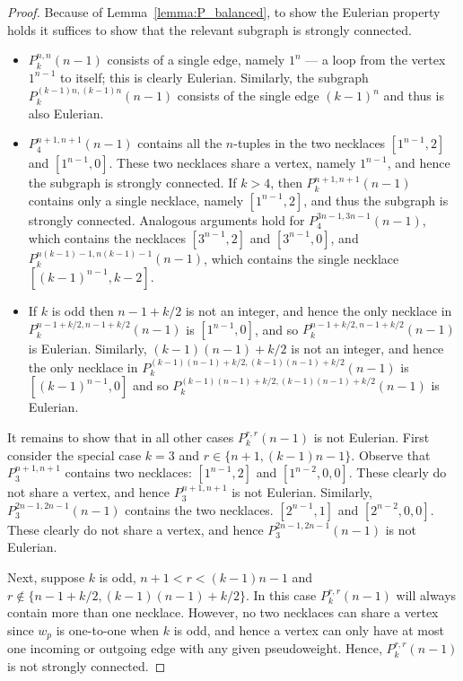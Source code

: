 \documentclass[a4paper,11pt]{article}
\theoremstyle{plain}
\theoremstyle{definition}
\theoremstyle{remark}
\begin{document}
\begin{proof}
Because of Lemma~\ref{lemma:P_balanced}, to show the Eulerian property holds it suffices to show
that the relevant subgraph is strongly connected.
\begin{itemize}
\item[(i)] $P_k^{n,n}(n-1)$ consists of a single edge, namely $1^n$ --- a loop from the vertex
    $1^{n-1}$ to itself; this is clearly Eulerian.  Similarly, the subgraph
    $P_k^{(k-1)n,(k-1)n}(n-1)$ consists of the single edge $(k-1)^n$ and thus is also Eulerian.
\item[(ii)] $P_4^{n+1,n+1}(n-1)$ contains all the $n$-tuples in the two necklaces $[1^{n-1},2]$
    and $[1^{n-1},0]$.  These two necklaces share a vertex, namely $1^{n-1}$, and hence the
    subgraph is strongly connected. If $k>4$, then $P_k^{n+1,n+1}(n-1)$ contains only a single
    necklace, namely $[1^{n-1},2]$, and thus the subgraph is strongly connected.  Analogous
    arguments hold for $P_4^{3n-1,3n-1}(n-1)$, which contains the necklaces $[3^{n-1},2]$ and
    $[3^{n-1},0]$, and $P_k^{n(k-1)-1,n(k-1)-1}(n-1)$, which contains the single necklace
    $[(k-1)^{n-1},k-2]$.
\item[(iii)] If $k$ is odd then $n-1+k/2$ is not an integer, and hence the only necklace in
    $P_k^{n-1+k/2,n-1+k/2}(n-1)$ is $[1^{n-1},0]$, and so $P_k^{n-1+k/2,n-1+k/2}(n-1)$ is
    Eulerian.  Similarly, $(k-1)(n-1)+k/2$ is not an integer, and hence the only necklace in
    $P_k^{(k-1)(n-1)+k/2,(k-1)(n-1)+k/2}(n-1)$ is $[(k-1)^{n-1},0]$ and so
    $P_k^{(k-1)(n-1)+k/2,(k-1)(n-1)+k/2}(n-1)$ is Eulerian.
\end{itemize}
It remains to show that in all other cases $P_k^{r,r}(n-1)$ is not Eulerian. First consider the
special case $k=3$ and $r\in\{n+1,(k-1)n-1\}$. Observe that $P_3^{n+1,n+1}$ contains two necklaces:
$[1^{n-1},2]$ and $[1^{n-2},0,0]$. These clearly do not share a vertex, and hence $P_3^{n+1,n+1}$
is not Eulerian.  Similarly, $P_3^{2n-1,2n-1}(n-1)$ contains the two necklaces. $[2^{n-1},1]$ and
$[2^{n-2},0,0]$. These clearly do not share a vertex, and hence $P_3^{2n-1,2n-1}(n-1)$ is not
Eulerian.

Next, suppose $k$ is odd, $n+1<r<(k-1)n-1$ and $r\notin\{n-1+k/2,(k-1)(n-1)+k/2\}$.  In this case
$P_k^{r,r}(n-1)$ will always contain more than one necklace. However, no two necklaces can share a
vertex since $w_p$ is one-to-one when $k$ is odd, and hence a vertex can only have at most one
incoming or outgoing edge with any given pseudoweight.  Hence, $P_k^{r,r}(n-1)$ is not strongly
connected.


\end{proof}
\end{document}
